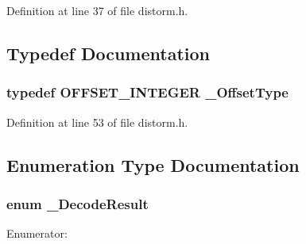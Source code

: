 Definition at line 37 of file distorm.h.

\subsection{Typedef Documentation}
\subsubsection[{\_\-OffsetType}]{\setlength{\rightskip}{0pt plus 5cm}typedef OFFSET\_\-INTEGER {\bf \_\-OffsetType}}\label{distorm_8h_65c86b0bc6d5815b4d8206f4febc3f71}




Definition at line 53 of file distorm.h.

\subsection{Enumeration Type Documentation}
\subsubsection[{\_\-DecodeResult}]{\setlength{\rightskip}{0pt plus 5cm}enum {\bf \_\-DecodeResult}}\label{distorm_8h_c283e6002ac5f51e11f4f90207b87b00}


\begin{Desc}
\item[Enumerator: ]\par
\begin{description}
\item[{\em 
DECRES\_\-NONE\label{distorm_8h_c283e6002ac5f51e11f4f90207b87b009551a9d6ea9b3d75d84cc74c1d4ff86c}
}]\item[{\em 
DECRES\_\-SUCCESS\label{distorm_8h_c283e6002ac5f51e11f4f90207b87b00a6aedfd474305276b80def44b7730017}
}]\item[{\em 
DECRES\_\-MEMORYERR\label{distorm_8h_c283e6002ac5f51e11f4f90207b87b004cd6726e1eefbbaf578edf55966fb74d}
}]\item[{\em 
DECRES\_\-INPUTERR\label{distorm_8h_c283e6002ac5f51e11f4f90207b87b0083c7628700b0583f81279c021dcbe424}
}]\end{description}
\end{Desc}



